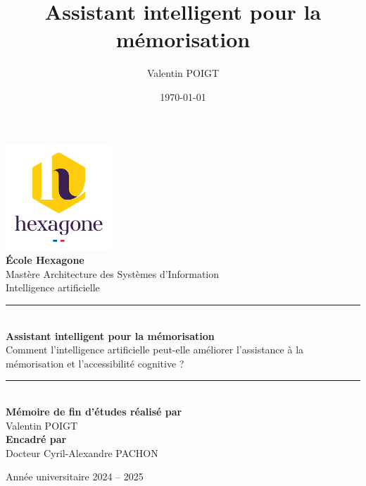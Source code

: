 \documentclass[11pt,a4paper]{report}
\title{Assistant intelligent pour la mémorisation}
\author{Valentin POIGT}
\date{\today}
\begin{document}
\justifying %

\begin{titlepage}
    \begin{center}
        \vspace*{\fill}

                \includegraphics[width=0.3\textwidth]{images/logo.png}\\[1cm]
                
                {\Large \textbf{École Hexagone}}\\[0.5cm]
                {\small Mastère Architecture des Systèmes d'Information}\\[0.5cm]
                {\small Intelligence artificielle}\\[0.5cm]

                \rule{\linewidth}{0.5mm}\\[1cm]
                
                {\LARGE \textbf{Assistant intelligent pour la mémorisation}} \\[0.5cm]
                {\Large Comment l'intelligence artificielle peut-elle améliorer l'assistance à la mémorisation et l'accessibilité cognitive ?}\\[0.5cm]

                \rule{\linewidth}{0.5mm}\\[1cm]
                
                \textbf{Mémoire de fin d'études réalisé par}\\
                {\Large Valentin POIGT}\\[1cm]
                
                \textbf{Encadré par}\\
                {\Large Docteur Cyril-Alexandre PACHON}\\[0.5cm]

                \vspace*{\fill}
                
                {\Large Année universitaire 2024 – 2025}
        \vspace*{\fill}
    \end{center}
\end{titlepage}
\end{document}
